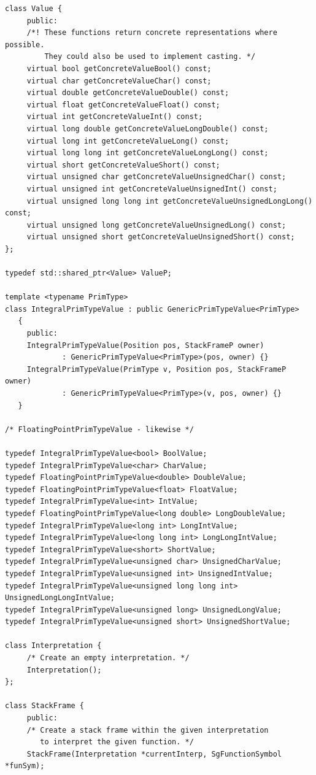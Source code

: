 \begin{enumerate}
\begin{enumerate}
\begin{lstlisting}
class Value {
     public:
     /*! These functions return concrete representations where possible.
         They could also be used to implement casting. */
     virtual bool getConcreteValueBool() const;
     virtual char getConcreteValueChar() const;
     virtual double getConcreteValueDouble() const;
     virtual float getConcreteValueFloat() const;
     virtual int getConcreteValueInt() const;
     virtual long double getConcreteValueLongDouble() const;
     virtual long int getConcreteValueLong() const;
     virtual long long int getConcreteValueLongLong() const;
     virtual short getConcreteValueShort() const;
     virtual unsigned char getConcreteValueUnsignedChar() const;
     virtual unsigned int getConcreteValueUnsignedInt() const;
     virtual unsigned long long int getConcreteValueUnsignedLongLong() const;
     virtual unsigned long getConcreteValueUnsignedLong() const;
     virtual unsigned short getConcreteValueUnsignedShort() const;
};

typedef std::shared_ptr<Value> ValueP;

template <typename PrimType>
class IntegralPrimTypeValue : public GenericPrimTypeValue<PrimType>
   {
     public:
     IntegralPrimTypeValue(Position pos, StackFrameP owner)
             : GenericPrimTypeValue<PrimType>(pos, owner) {}
     IntegralPrimTypeValue(PrimType v, Position pos, StackFrameP owner)
             : GenericPrimTypeValue<PrimType>(v, pos, owner) {}
   }

/* FloatingPointPrimTypeValue - likewise */

typedef IntegralPrimTypeValue<bool> BoolValue;
typedef IntegralPrimTypeValue<char> CharValue;
typedef FloatingPointPrimTypeValue<double> DoubleValue;
typedef FloatingPointPrimTypeValue<float> FloatValue;
typedef IntegralPrimTypeValue<int> IntValue;
typedef FloatingPointPrimTypeValue<long double> LongDoubleValue;
typedef IntegralPrimTypeValue<long int> LongIntValue;
typedef IntegralPrimTypeValue<long long int> LongLongIntValue;
typedef IntegralPrimTypeValue<short> ShortValue;
typedef IntegralPrimTypeValue<unsigned char> UnsignedCharValue;
typedef IntegralPrimTypeValue<unsigned int> UnsignedIntValue;
typedef IntegralPrimTypeValue<unsigned long long int> UnsignedLongLongIntValue;
typedef IntegralPrimTypeValue<unsigned long> UnsignedLongValue;
typedef IntegralPrimTypeValue<unsigned short> UnsignedShortValue;

class Interpretation {
     /* Create an empty interpretation. */
     Interpretation();
};

class StackFrame {
     public:
     /* Create a stack frame within the given interpretation
        to interpret the given function. */
     StackFrame(Interpretation *currentInterp, SgFunctionSymbol *funSym);


\end{lstlisting}
\end{enumerate}
\end{enumerate}
